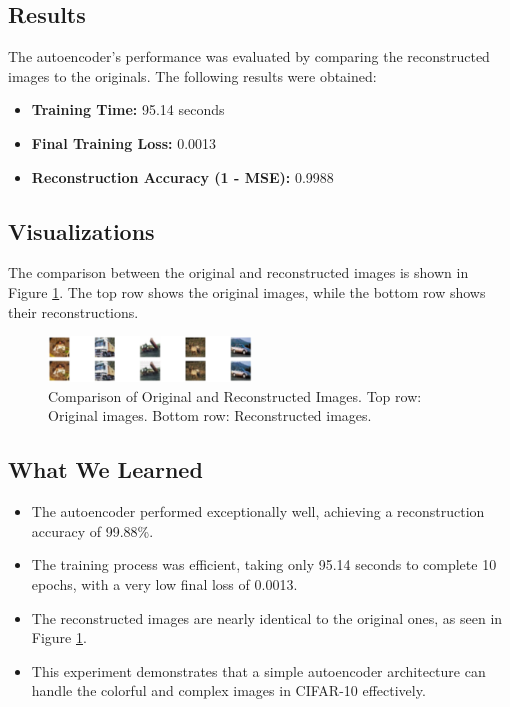 \documentclass[lettersize,journal]{IEEEtran}
\begin{document}
\subsection{\textbf{Results}}
The autoencoder’s performance was evaluated by comparing the reconstructed images to the originals. The following results were obtained:
\begin{itemize}
    \item \textbf{Training Time:} 95.14 seconds
    \item \textbf{Final Training Loss:} 0.0013
    \item \textbf{Reconstruction Accuracy (1 - MSE):} 0.9988
\end{itemize}

\subsection{\textbf{Visualizations}}
The comparison between the original and reconstructed images is shown in Figure \ref{fig:comparison-tf-cifar}. The top row shows the original images, while the bottom row shows their reconstructions.

\begin{figure}[H]
    \centering
    \includegraphics[width=0.48\textwidth]{autoencoder_comparison_tf_cifar.png}
    \caption{Comparison of Original and Reconstructed Images. Top row: Original images. Bottom row: Reconstructed images.}
    \label{fig:comparison-tf-cifar}
\end{figure}

\subsection{\textbf{What We Learned}}
\begin{itemize}
    \item The autoencoder performed exceptionally well, achieving a reconstruction accuracy of 99.88\%.
    \item The training process was efficient, taking only 95.14 seconds to complete 10 epochs, with a very low final loss of 0.0013.
    \item The reconstructed images are nearly identical to the original ones, as seen in Figure \ref{fig:comparison-tf-cifar}.
    \item This experiment demonstrates that a simple autoencoder architecture can handle the colorful and complex images in CIFAR-10 effectively.
\end{itemize}
\end{document}
